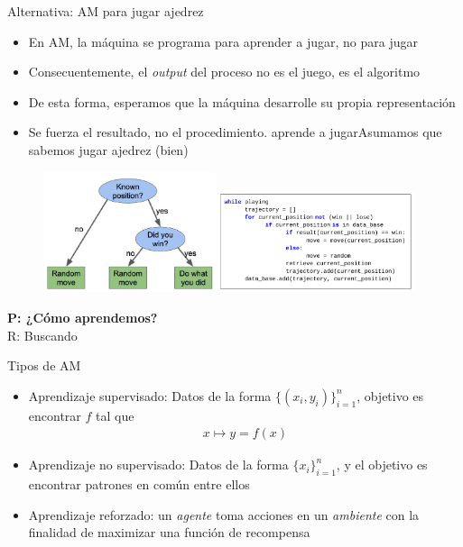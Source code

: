 \documentclass[9pt]{beamer}
\begin{document}
\begin{frame}{Alternativa: AM para jugar ajedrez}

  \begin{itemize}
    \item En AM, la máquina se programa para aprender a jugar, no para jugar
    \item Consecuentemente, el \emph{output} del proceso no es el juego, es el algoritmo
    \item De esta forma, esperamos que la máquina desarrolle su propia representación
    \item Se fuerza el resultado, no el procedimiento. aprende a jugarAsumamos que sabemos jugar ajedrez (bien)
  \end{itemize}
  \vfill
  \begin{figure}
    \centering
    \includegraphics[width=0.45\textwidth]{../../img/cap0_chess_ml_diag}\hfill \includegraphics[width=0.52\textwidth]{../../img/cap0_chess_ml_code}
  \end{figure}
  \textbf{P: ¿Cómo aprendemos?}\\ R: Buscando 
\end{frame}

\begin{frame}{Tipos de AM}

  \begin{itemize}
    \item Aprendizaje supervisado: 
    Datos de la forma $\{(x_i,y_i)\}_{i=1}^n$, objetivo es encontrar $f$ tal que
    \begin{align}
    x \mapsto y = f(x)
    \end{align}
    \item Aprendizaje no supervisado: Datos de la forma $\{x_i\}_{i=1}^n$, y el objetivo es encontrar patrones en común entre ellos
    \item Aprendizaje reforzado: un \emph{agente}  toma acciones en un \emph{ambiente} con la finalidad de maximizar una función de recompensa
  \end{itemize}

\end{frame}
\end{document}
